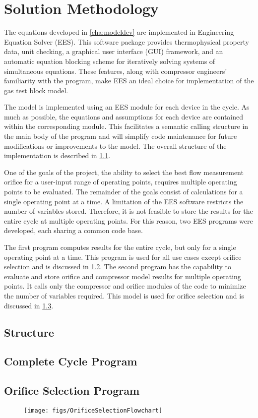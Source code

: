 \chapter{Solution Methodology} \label{cha:solnmethod}

The equations developed in \cref{cha:modeldev} are implemented in
Engineering Equation Solver (EES). 
This software package provides thermophysical property data, unit checking, 
a graphical user interface (GUI) framework, and an automatic equation 
blocking scheme for iteratively solving systems of simultaneous equations. 
These features, along with compressor engineers' familiarity with the program, 
make EES an ideal choice for implementation of the gas test block model.

The model is implemented using an EES module for each device in the cycle. 
As much as possible, the equations and assumptions for each device are contained
within the corresponding module.
This facilitates a semantic calling structure in the main body of the program 
and will simplify code maintenance for future modifications or improvements 
to the model.
The overall structure of the implementation is described in \cref{sec:Overall}.

One of the goals of the project, the ability to select the best flow measurement
orifice for a user-input range of operating points, requires multiple operating points
to be evaluated.
The remainder of the goals consist of calculations for a single operating point at a time.
A limitation of the EES software restricts the number of variables stored.
Therefore, it is not feasible to store the results for the entire cycle at multiple operating points.
For this reason, two EES programs were developed, each sharing a common code base. 

The first program computes results for the entire cycle, but only 
for a single operating point at a time.
This program is used for all use cases except orifice selection
and is discussed in \cref{sec:MainModel}.
The second program has the capability to evaluate and store orifice and 
compressor model results for multiple operating points.
It calls only the compressor and orifice modules of the code to minimize the number of variables required.
This model is used for orifice selection and is discussed in \cref{sec:OrifSelect}.

\section{Structure} \label{sec:Overall}

\section{Complete Cycle Program} \label{sec:MainModel}

\section{Orifice Selection Program} \label{sec:OrifSelect}

\begin{figure}
  \centering
  \texttt{[image: figs/OrificeSelectionFlowchart]}
  \caption{}
  \label{fig:FlowOrifSelect}
\end{figure}